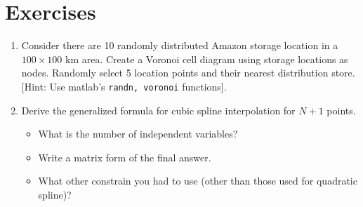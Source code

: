 \documentclass[11pt,titlepage,fleqn]{article}
\begin{document}
\section{Exercises}
\begin{enumerate}
\item Consider there are 10 randomly distributed Amazon storage location in a $100 \times 100$ km area. Create a Voronoi cell diagram using storage locations as nodes. Randomly select 5 location points and their nearest distribution store. [Hint: Use matlab's \verb+randn, voronoi+ functions].

\item Derive the generalized formula for cubic spline interpolation for $N+1$ points.
\begin{itemize}
\item What is the number of independent variables?
\item Write a matrix form of the final answer.
\item What other constrain you had to use (other than those used for quadratic spline)?
\end{itemize}
\end{enumerate}
\end{document}
